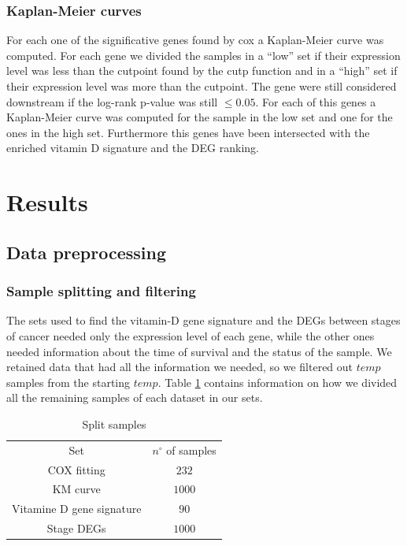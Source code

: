 \documentclass[fleqn,10pt]{SelfArx} %
\begin{document}
		\subsubsection{Kaplan-Meier curves}
		For each one of the significative genes found by cox a Kaplan-Meier curve was computed.
		For each gene we divided the samples in a ``low'' set if their expression level was less than the cutpoint found by the cutp function and in a ``high'' set if their expression level was more than the cutpoint.
		The gene were still considered downstream if the log-rank p-value was still $\le0.05$.
		For each of this genes a Kaplan-Meier curve was computed for the sample in the low set and one for the ones in the high set.
		Furthermore this genes have been intersected with the enriched vitamin D signature and the DEG ranking.

\section{Results}

	\subsection{Data preprocessing}

		\subsubsection{Sample splitting and filtering}
		The sets used to find the vitamin-D gene signature and the DEGs between stages of cancer needed only the expression level of each gene, while the other ones needed information about the time of survival and the status of the sample.
		We retained data that had all the information we needed, so we filtered out $temp$ samples from the starting $temp$.
		Table \ref{tab:samples_split} contains information on how we divided all the remaining samples of each dataset in our sets.

		\begin{table}[H]
			\centering
			\begin{tabular}{cc}
				\hline
				Set & $n^\circ$ of samples\\
				COX fitting & $232$\\
				KM curve & $1000$\\
				Vitamine D gene signature & $90$\\
				Stage DEGs & $1000$\\
				\hline
			\end{tabular}
			\caption{Split samples}
			\label{tab:samples_split}
		\end{table}
\end{document}
